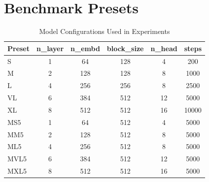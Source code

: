 \section{Benchmark Presets}
\label{appendix:presets}

\begin{table}[H]
\centering
\begin{tabular}{lccccc}
\hline
\textbf{Preset} & \textbf{n\_layer} & \textbf{n\_embd} & \textbf{block\_size} & \textbf{n\_head} & \textbf{steps} \\
\hline

\hline
S            & 1 & 64  & 128 & 4  & 200   \\
M            & 2 & 128 & 128 & 8  & 1000  \\
L            & 4 & 256 & 256 & 8  & 2500  \\
VL           & 6 & 384 & 512 & 12 & 5000  \\
XL           & 8 & 512 & 512 & 16 & 10000 \\

\hline
MS5          & 1 & 64  & 512 & 4  & 5000 \\
MM5          & 2 & 128 & 512 & 8  & 5000 \\
ML5          & 4 & 256 & 512 & 8  & 5000 \\
MVL5         & 6 & 384 & 512 & 12 & 5000 \\
MXL5         & 8 & 512 & 512 & 16 & 5000 \\

\hline
\end{tabular}
\caption{Model Configurations Used in Experiments}
\label{tab:model_configs}
\end{table}

